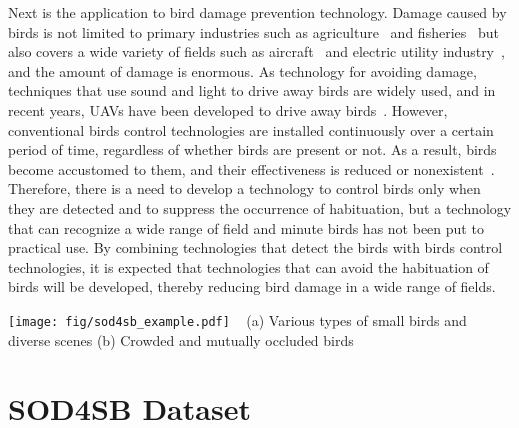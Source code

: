 \documentclass{mva_style}
\begin{document}
Next is the application to bird damage prevention technology.
Damage caused by birds is not limited to primary industries such as agriculture~\cite{dehaven1981estimating} and fisheries~\cite{spanier1980use} but also covers a wide variety of fields such as aircraft~\cite{hedayati2015bird} and electric utility industry~\cite{huppop2006bird}, and the amount of damage is enormous.
As technology for avoiding damage, techniques that use sound and light to drive away birds are widely used, and in recent years, UAVs have been developed to drive away birds~\cite{grimm2012autonomous}.
However, conventional birds control technologies are installed continuously over a certain period of time, regardless of whether birds are present or not. As a result, birds become accustomed to them, and their effectiveness is reduced or nonexistent~\cite{mahesh2017distress}. Therefore, there is a need to develop a technology to control birds only when they are detected and to suppress the occurrence of habituation, but a technology that can recognize a wide range of field and minute birds has not been put to practical use.
By combining technologies that detect the birds with birds control technologies, it is expected that technologies that can avoid the habituation of birds will be developed, thereby reducing bird damage in a wide range of fields.





\begin{figure*}[t]
  \begin{center}
    \texttt{[image: fig/sod4sb\_example.pdf]}
  ~\hspace*{5mm}
    (a) Various types of small birds and diverse scenes\label{fig:small_birds} \hspace*{10mm} (b) Crowded and mutually occluded birds\label{fig:birds_crowd}  \hspace*{0mm}
    \end{center}
  \vspace{-5mm}
  \caption{Samples of SOD4SB. As shown in (a) and (b), the birds in this dataset are not only small, but also require recognition in a variety of scenes and furthermore occlude each other, making it a challenging dataset for the SOD task.}
  \label{fig:sod4sb_sample}
\end{figure*}

\section{SOD4SB Dataset}
\end{document}
